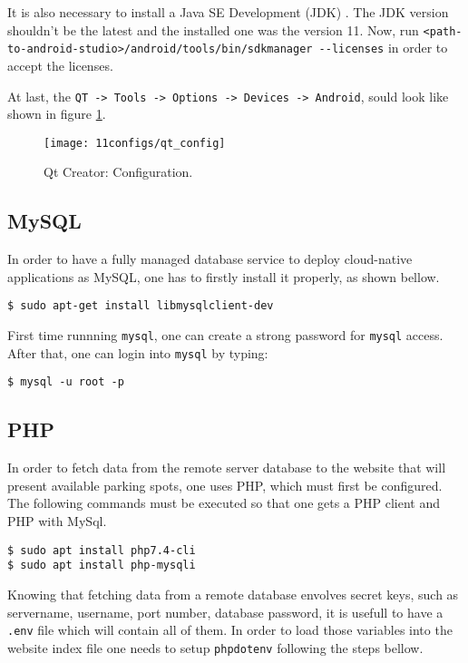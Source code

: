 It is also necessary to install a Java SE Development (JDK) \cite{java}. The JDK version shouldn't be the latest and the installed one was the version 11. Now, run \verb|<path-to-android-studio>/android/tools/bin/sdkmanager --licenses| in order to accept the licenses. 

At last, the \verb|QT -> Tools -> Options -> Devices -> Android|, sould look like shown in figure \ref{fig:qt_config}.

\begin{figure}[H]
	\centering	
	\texttt{[image: 11configs/qt\_config]}
	\caption{Qt Creator: Configuration.}
	\label{fig:qt_config}
\end{figure}

\subsection{MySQL}
In order to have a fully managed database service to deploy cloud-native applications as MySQL, one has to firstly install it properly, as shown bellow.

\begin{lstlisting}
$ sudo apt-get install libmysqlclient-dev
\end{lstlisting}

First time runnning \verb|mysql|, one can create a strong password for \verb|mysql| access. After that, one can login into \verb|mysql| by typing:

\begin{lstlisting}
$ mysql -u root -p
\end{lstlisting}

\subsection{PHP}
In order to fetch data from the remote server database to the website that will present available parking spots, one uses PHP, which must first be configured. The following commands must be executed so that one gets a PHP client and PHP with MySql.

\begin{lstlisting}
$ sudo apt install php7.4-cli
$ sudo apt install php-mysqli
\end{lstlisting}

Knowing that fetching data from a remote database envolves secret keys, such as servername, username, port number, database password, it is usefull to have a \verb|.env| file which will contain all of them. In order to load those variables into the website index file one needs to setup \verb|phpdotenv| following the steps bellow. \cite{phpdotenv}

